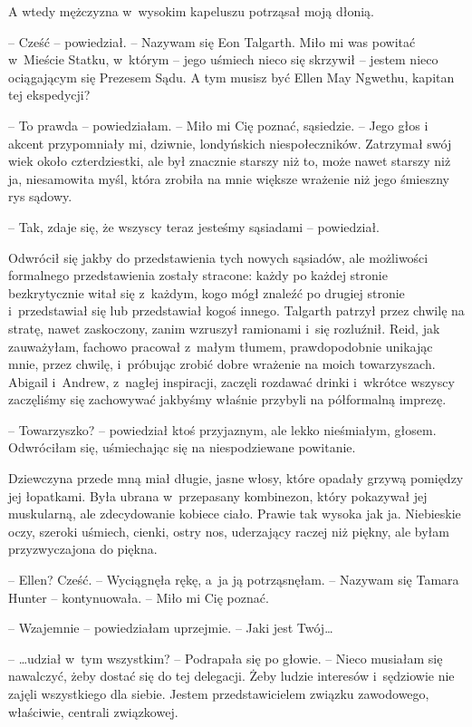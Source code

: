 \documentclass[oneside,polish,11pt,sfheadings]{mwbk}
\begin{document}
A wtedy mężczyzna w~wysokim kapeluszu potrząsał moją dłonią.

-- Cześć -- powiedział. -- Nazywam się Eon Talgarth. Miło mi was powitać w~Mieście Statku, w~którym -- jego uśmiech nieco się skrzywił -- jestem
nieco ociągającym się Prezesem Sądu. A tym musisz być Ellen May Ngwethu,
kapitan tej ekspedycji?

-- To prawda -- powiedziałam. -- Miło mi Cię poznać, sąsiedzie. -- Jego głos
i akcent przypomniały mi, dziwnie, londyńskich niespołeczników.
Zatrzymał swój wiek około czterdziestki, ale był znacznie starszy niż
to, może nawet starszy niż ja, niesamowita myśl, która zrobiła na mnie
większe wrażenie niż jego śmieszny rys sądowy.

-- Tak, zdaje się, że wszyscy teraz jesteśmy sąsiadami -- powiedział.

Odwrócił się jakby do przedstawienia tych nowych sąsiadów, ale
możliwości formalnego przedstawienia zostały stracone: każdy po każdej
stronie bezkrytycznie witał się z~każdym, kogo mógł znaleźć po drugiej
stronie i~przedstawiał się lub przedstawiał kogoś innego. Talgarth
patrzył przez chwilę na stratę, nawet zaskoczony, zanim wzruszył
ramionami i~się rozluźnił. Reid, jak zauważyłam, fachowo pracował z~małym tłumem, prawdopodobnie unikając mnie, przez chwilę, i~próbując
zrobić dobre wrażenie na moich towarzyszach. Abigail i~Andrew, z~nagłej
inspiracji, zaczęli rozdawać drinki i~wkrótce wszyscy zaczęliśmy się
zachowywać jakbyśmy właśnie przybyli na półformalną imprezę.

-- Towarzyszko? -- powiedział ktoś przyjaznym, ale lekko nieśmiałym,
głosem. Odwróciłam się, uśmiechając się na niespodziewane powitanie.

Dziewczyna przede mną miał długie, jasne włosy, które opadały grzywą
pomiędzy jej łopatkami. Była ubrana w~przepasany kombinezon, który
pokazywał jej muskularną, ale zdecydowanie kobiece ciało. Prawie tak
wysoka jak ja. Niebieskie oczy, szeroki uśmiech, cienki, ostry nos,
uderzający raczej niż piękny, ale byłam przyzwyczajona do piękna.

-- Ellen? Cześć. -- Wyciągnęła rękę, a~ja ją potrząsnęłam. -- Nazywam się
Tamara Hunter -- kontynuowała. -- Miło mi Cię poznać.

-- Wzajemnie -- powiedziałam uprzejmie. -- Jaki jest Twój\ldots 

-- \ldots  udział w~tym wszystkim? -- Podrapała się po głowie. -- Nieco
musiałam się nawalczyć, żeby dostać się do tej delegacji. Żeby ludzie
interesów i~sędziowie nie zajęli wszystkiego dla siebie. Jestem
przedstawicielem związku zawodowego, właściwie, centrali związkowej.
\end{document}
